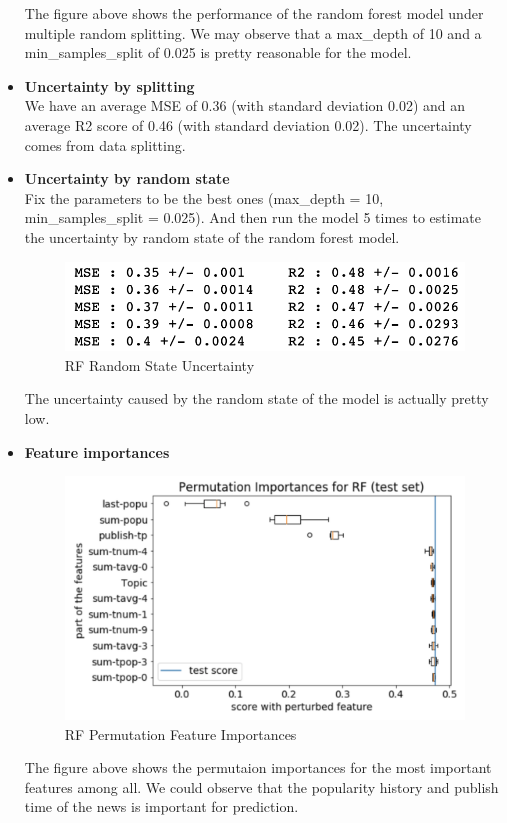 \documentclass{article}
\begin{document}
\begin{itemize}
The figure above shows the performance of the random forest model under multiple random splitting. We may observe that a max\_depth of 10 and a min\_samples\_split of 0.025 is pretty reasonable for the model. 
\item \textbf{Uncertainty by splitting}\\
We have an average MSE of 0.36 (with standard deviation 0.02) and an average R2 score of 0.46 (with standard deviation 0.02). The uncertainty comes from data splitting.
\item \textbf{Uncertainty by random state}\\
Fix the parameters to be the best ones (max\_depth = 10, min\_samples\_split = 0.025). And then run the model 5 times to estimate the uncertainty by random state of the random forest model. 
\begin{figure}[H]
\centering
\includegraphics[scale=0.5]{"rf_rs_unc"}
\caption{RF Random State Uncertainty}
\end{figure}
The uncertainty caused by the random state of the model is actually pretty low.
\item \textbf{Feature importances}
\begin{figure}[H]
\centering
\includegraphics[scale=0.5]{"rf_perm_imp"}
\caption{RF Permutation Feature Importances}
\end{figure}
The figure above shows the permutaion importances for the most important features among all. We could observe that the popularity history and publish time of the news is important for prediction.
\end{itemize}
\end{document}
